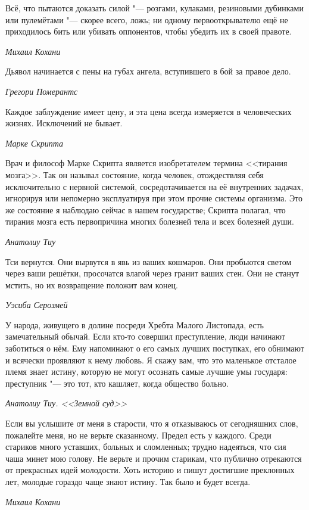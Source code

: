 \documentclass[a4paper,10pt]{book}
\begin{document}
\epigraph{Всё, что пытаются доказать силой "--- розгами, кулаками, резиновыми 
дубинками или пулемётами "--- 
скорее всего, ложь; ни одному первооткрывателю ещё не приходилось бить или 
убивать оппонентов, 
чтобы убедить их в своей правоте.}
{\textit{Михаил Кохани}}

\epigraph{Дьявол начинается с пены на губах ангела, вступившего в бой за правое 
дело.}
{\textit{Грегори Померантс}}

\epigraph{Каждое заблуждение имеет цену, и эта цена всегда измеряется в 
человеческих жизнях. Исключений не бывает.}
{\textit{Марке Скрипта}}

 \epigraph{Врач и философ Марке Скрипта является изобретателем термина 
<<тирания 
мозга>>. Так он называл состояние, когда человек, отождествляя себя 
исключительно с нервной системой, сосредотачивается на её внутренних задачах, 
игнорируя или непомерно эксплуатируя при этом прочие системы организма. Это же 
состояние я наблюдаю сейчас в нашем государстве; Скрипта полагал, что тирания 
мозга есть первопричина многих болезней тела и всех болезней души.}
{\textit{Анатолиу Тиу}}
 
\epigraph{Тси вернутся. Они вырвутся в явь из ваших кошмаров. Они пробьются 
светом через ваши решётки, просочатся влагой через гранит ваших стен. Они не 
станут мстить, но их возвращение положит вам конец.}
{\textit{Уэсиба Серозмей}}

\epigraph{У народа, живущего в долине посреди Хребта Малого Листопада, есть 
замечательный обычай. Если кто-то совершил преступление, люди начинают 
заботиться о нём. Ему напоминают о его самых лучших поступках, его обнимают и 
всячески проявляют к нему любовь. Я скажу вам, что это маленькое отсталое племя 
знает истину, которую не могут осознать самые лучшие умы государя: преступник 
"--- это тот, кто кашляет, когда общество больно.}
{\textit{Анатолиу Тиу. <<Земной суд>>}}

\epigraph{Если вы услышите от меня в старости, что я отказываюсь от сегодняшних 
слов, пожалейте меня, но не верьте сказанному. Предел есть у каждого. Среди 
стариков много уставших, больных и сломленных; трудно надеяться, что сия чаша 
минет мою голову. Не верьте и прочим старикам, что публично отрекаются от 
прекрасных идей молодости. Хоть историю и пишут достигшие преклонных лет, 
молодые гораздо чаще знают истину. Так было и будет всегда.}
{\textit{Михаил Кохани}}
\end{document}
